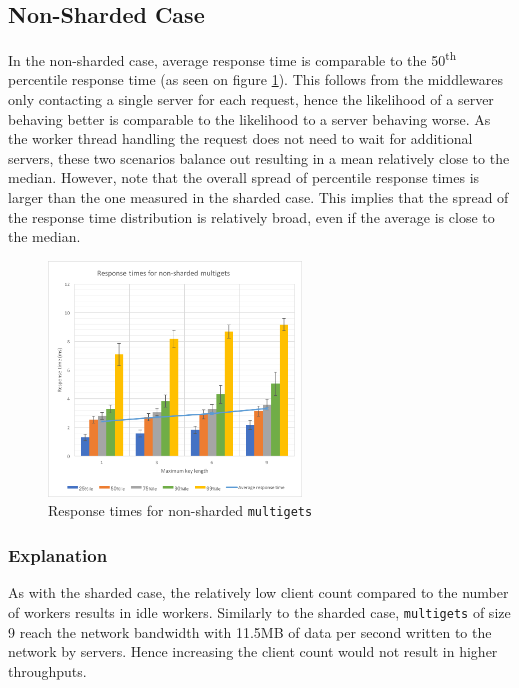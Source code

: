 \documentclass[11pt,a4paper]{article}
\begin{document}
\subsection{Non-Sharded Case}
In the non-sharded case, average response time is comparable to the 50\textsuperscript{th} percentile response time (as seen on figure \ref{png::get_and_multigets_latency-keylen_non-sharded}). This follows from the middlewares only contacting a single server for each request, hence the likelihood of a server behaving better is comparable to the likelihood to a server behaving worse. As the worker thread handling the request does not need to wait for additional servers, these two scenarios balance out resulting in a mean relatively close to the median. However, note that the overall spread of percentile response times is larger than the one measured in the sharded case. This implies that the spread of the response time distribution is relatively broad, even if the average is close to the median.

\begin{figure}[!h]
    \centering
    \includegraphics[width=0.6\textwidth]{processing/graphics/get_and_multigets_latency-keylen_non-sharded.png}
    \caption{Response times for non-sharded \texttt{multigets}}
    \label{png::get_and_multigets_latency-keylen_non-sharded}
\end{figure}

\subsubsection{Explanation}
As with the sharded case, the relatively low client count compared to the number of workers results in idle workers. Similarly to the sharded case, \texttt{multigets} of size 9 reach the network bandwidth with 11.5MB of data per second written to the network by servers. Hence increasing the client count would not result in higher throughputs.
\end{document}
